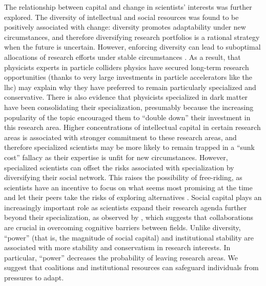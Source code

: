 \documentclass{article}
\begin{document}
The relationship between capital and change in scientists' interests was further explored. The diversity of intellectual and social resources was found to be positively associated with change: diversity promotes adaptability under new circumstances, and therefore diversifying research portfolios is a rational strategy when the future is uncertain. However, enforcing diversity can lead to suboptimal allocations of research efforts under stable circumstances \citep{Schimmelpfennig2021}. As a result, that physicists experts in particle colliders physics have secured long-term research opportunities (thanks to very large investments in particle accelerators like the \gls{lhc}) may explain why they have preferred to remain particularly specialized and conservative. There is also evidence that physicists specialized in dark matter have been consolidating their specialization, presumably because the increasing popularity of the topic encouraged them to ``double down'' their investment in this research area. Higher concentrations of intellectual capital in certain research areas is associated with stronger commitment to these research areas, and therefore specialized scientists may be more likely to remain trapped in a ``sunk cost'' fallacy as their expertise is unfit for new circumstances. However, specialized scientists can offset the risks associated with specialization by diversifying their social network. This raises the possibility of free-riding, as scientists have an incentive to focus on what seems most promising at the time and let their peers take the risks of exploring alternatives \citep{Kummerfeld2016}. Social capital plays an increasingly important role as scientists expand their research agenda further beyond their specialization, as observed by \citealt{Tripodi2020}, which suggests that collaborations are crucial in overcoming cognitive barriers between fields. Unlike diversity, ``power'' (that is, the magnitude of social capital) and institutional stability are associated with more stability and conservatism in research interests. In particular, ``power'' decreases the probability of leaving research areas. We suggest that coalitions and institutional resources can safeguard individuals from pressures to adapt. 
\end{document}

